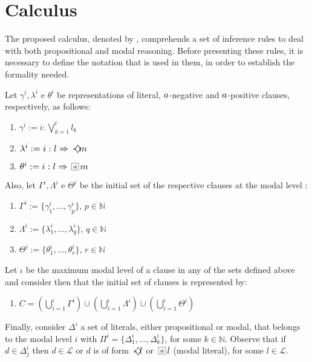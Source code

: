 \section{Calculus}
\label{sec:calculus}

The proposed calculus, denoted by \ckn, comprehends a set of inference rules to
deal with both propositional and modal reasoning. Before presenting these rules,
it is necessary to define the notation that is used in them, in order to
establish the formality needed.

\begin{definition}
\label{def_conjuntos}
Let $\gamma^i, \lambda^i$ e $\theta^i$ be representations of 
literal, $\agent$-negative and $\agent$-positive clauses, respectively,
as follows:
\begin{enumerate}
\item $\gamma^i := i : \bigvee^t_{k=1} l_k$
    \vspace{0.4em}
\item $\lambda^i := i : l \then \pos{a}m$
    \vspace{0.4em}
\item $\theta^i := i : l \then \nec{a}m$
\end{enumerate}

Also, let $\Gamma^i, \Lambda^i$ e $\Theta^i$ be the initial set of the  
respective clauses at the modal level \ml:
\begin{enumerate}
   \item $\Gamma^i := \{\gamma_1^i, \ldots, \gamma_p^i\}$, $p \in \mathbb{N}$
    \vspace{0.4em}
   \item $\Lambda^i := \{\lambda_1^i, \ldots, \lambda_q^i\}$, $q \in \mathbb{N}$
    \vspace{0.4em}
   \item $\Theta^i := \{\theta_1^i, \ldots, \theta_r^i\}$, $r \in \mathbb{N}$
\end{enumerate}

Let $\iota$ be the maximum modal level of a clause in any of the sets defined
above and consider then that the initial set of clauses is represented by:
\begin{enumerate}
    \item $C = (\bigcup_{i=1}^{\iota} \Gamma^i) \cup (\bigcup_{i=1}^{\iota} \Lambda^i)
        \cup (\bigcup_{i=1}^{\iota} \Theta^i)$ 
\end{enumerate}

Finally, consider $\Delta^i$ a set of literals, either propositional or modal,
that belongs to the modal level $i$ with $\Pi^i = \{\Delta^i_1, \ldots,
\Delta^i_k\}$, for some $k \in \mathbb{N}$. Observe that if $d \in \Delta^i_j$
then $d \in \mathcal{L}$ or $d$ is of form $\pos{a} l$ or $\nec{a} l$
(modal literal), for some $l \in \mathcal{L}$.
\end{definition}

